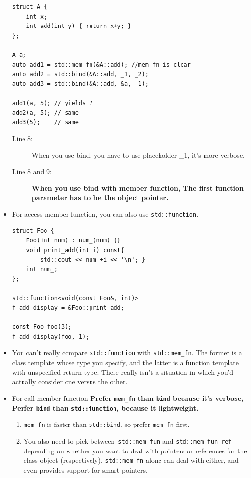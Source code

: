 \documentclass[a4paper,11pt,twoside]{book}
\begin{document}
\begin{itemize}
\begin{lstlisting}
struct A { 
	int x;
	int add(int y) { return x+y; }
};

A a;
auto add1 = std::mem_fn(&A::add); //mem_fn is clear
auto add2 = std::bind(&A::add, _1, _2);
auto add3 = std::bind(&A::add, &a, -1);

add1(a, 5); // yields 7
add2(a, 5); // same
add3(5);    // same
\end{lstlisting}
\begin{description}

	\item[Line 8:] When you use bind, you have to use placeholder \_1, it's more verbose.
	\item[Line 8 and 9:] \textbf{When you use bind with member function, The first function parameter has to be the object pointer.}
\end{description}

\item For access member function, you can also use \texttt{std::function}.

\begin{lstlisting}[numbers=none]
struct Foo {
	Foo(int num) : num_(num) {}
	void print_add(int i) const{
		std::cout << num_+i << '\n'; }
	int num_;
};

std::function<void(const Foo&, int)> 
f_add_display = &Foo::print_add;

const Foo foo(3);
f_add_display(foo, 1); 	
\end{lstlisting}		

	\item You can't really compare \texttt{std::function} with \texttt{std::mem\_fn}. The former is a class template whose type you specify, and the latter is a function template with unspecified return type. There really isn't a situation in which you'd actually consider one versus the other.

	\item For call member function \textbf{Prefer \texttt{mem\_fn} than \texttt{bind} because it's verbose, Perfer \texttt{bind}  than \texttt{std::function}, because it lightweight.}

\begin{enumerate}
	\item \texttt{mem\_fn} is faster than \texttt{std::bind}.  so prefer \texttt{mem\_fn} first.
	
	\item You also need to pick between\texttt{ std::mem\_fun} and \texttt{std::mem\_fun\_ref} depending on whether you want to deal with pointers or references for the class object (respectively). \texttt{std::mem\_fn} alone can deal with either, and even provides support for smart pointers.
\end{enumerate}




\end{itemize}
\end{document}
